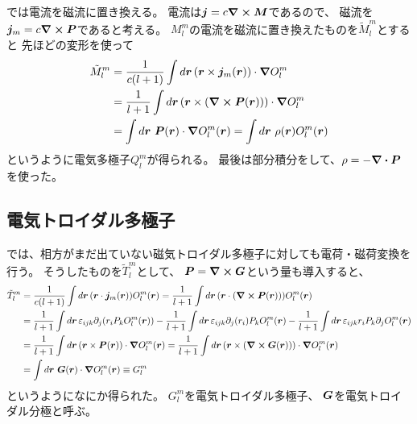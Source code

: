 \documentclass[../master.tex]{subfiles}
\begin{document}
では電流を磁流に置き換える。
電流は\(\vb*{j}=c\curl \vb*{M}\)であるので、
磁流を\(\vb*{j}_m=c\curl \vb*{P}\)であると考える。
\(M_l^m\)の電流を磁流に置き換えたものを\(\tilde{M}_l^m\)とすると
先ほどの変形を使って
\begin{equation}\begin{aligned}[b]
    \tilde{M}_l^m
    &= \frac{1}{c(l+1)}\int d\vb*{r}\, (\vb*{r}\times \vb*{j}_m(\vb*{r}))\cdot\grad O_l^m\\
    &= \frac{1}{l+1}\int d\vb*{r}\, (\vb*{r}\times (\curl \vb*{P}(\vb*{r}))) \cdot\grad O_l^m\\
    &= \int d\vb*{r}\, \,\vb*{P}(\vb*{r}) \cdot \grad O_l^m(\vb*{r})
    = \int d\vb*{r}\, \,\rho(\vb*{r}) O_l^m(\vb*{r})
\end{aligned}\end{equation}
というように電気多極子\(Q_l^m\)が得られる。
最後は部分積分をして、\(\rho = -\div \vb*{P}\)を使った。

\subsection{電気トロイダル多極子}
では、相方がまだ出ていない磁気トロイダル多極子に対しても電荷・磁荷変換を行う。
そうしたものを\(\tilde{T}_l^m\)として、
\(\vb*{P} =\curl \vb*{G}\)という量も導入すると、
\begin{equation}\begin{aligned}[b]
    \tilde{T}_l^m
    &= \frac{1}{c(l+1)} \int d\vb*{r}\, (\vb*{r}\cdot \vb*{j}_m(\vb*{r}))O_l^m(\vb*{r})
    = \frac{1}{l+1} \int d\vb*{r}\, (\vb*{r}\cdot (\curl \vb*{P}(\vb*{r})))O_l^m(\vb*{r})\\
    &= \frac{1}{l+1} \int d\vb*{r}\, \varepsilon_{ijk} \partial_j(r_i P_k O_l^m(\vb*{r}))
    - \frac{1}{l+1} \int d\vb*{r}\, \varepsilon_{ijk} \partial_j(r_i) P_k O_l^m(\vb*{r})
    - \frac{1}{l+1} \int d\vb*{r}\, \varepsilon_{ijk} r_i P_k \partial_jO_l^m(\vb*{r})\\
    &= \frac{1}{l+1} \int d\vb*{r}\, (\vb*{r}\times \vb*{P}(\vb*{r})) \cdot \grad O_l^m(\vb*{r})
    = \frac{1}{l+1} \int d\vb*{r}\, (\vb*{r}\times (\curl \vb*{G}(\vb*{r}))) \cdot \grad O_l^m(\vb*{r})\\
    &= \int d\vb*{r}\, \,\vb*{G}(\vb*{r}) \cdot \grad O_l^m(\vb*{r})
    \equiv G_l^m
\end{aligned}\end{equation}
というようになにか得られた。
\(G_l^m\)を電気トロイダル多極子、
\(\vb*{G}\)を電気トロイダル分極と呼ぶ。
\end{document}
